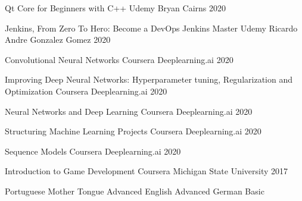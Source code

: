\begin{cvhonors}
    
  \cvhonor
    {Qt Core for Beginners with C++} %
    {Udemy} %
    {Bryan Cairns} %
    {2020} %
    
  \cvhonor
    {Jenkins, From Zero To Hero: Become a DevOps Jenkins Master} %
    {Udemy} %
    {Ricardo Andre Gonzalez Gomez} %
    {2020} %
    
  \cvhonor
    {Convolutional Neural Networks} %
    {Coursera} %
    {Deeplearning.ai} %
    {2020} %
    
  \cvhonor
    {Improving Deep Neural Networks: Hyperparameter tuning, Regularization and Optimization} %
    {Coursera} %
    {Deeplearning.ai} %
    {2020} %
    
  \cvhonor
    {Neural Networks and Deep Learning} %
    {Coursera} %
    {Deeplearning.ai} %
    {2020} %
    
  \cvhonor
    {Structuring Machine Learning Projects} %
    {Coursera} %
    {Deeplearning.ai} %
    {2020} %
    
  \cvhonor
    {Sequence Models} %
    {Coursera} %
    {Deeplearning.ai} %
    {2020} %
    
  \cvhonor
    {Introduction to Game Development} %
    {Coursera} %
    {Michigan State University} %
    {2017} %
    
    
    
\end{cvhonors}
    
\begin{cvhonors}
    
  \cvhonorzzz
    {Portuguese} %
    {Mother Tongue} %
    {Advanced} %
  \cvhonorzz
    {English} %
    {Advanced} %
  \cvhonorzz
    {German} %
    {Basic} %
    
\end{cvhonors}